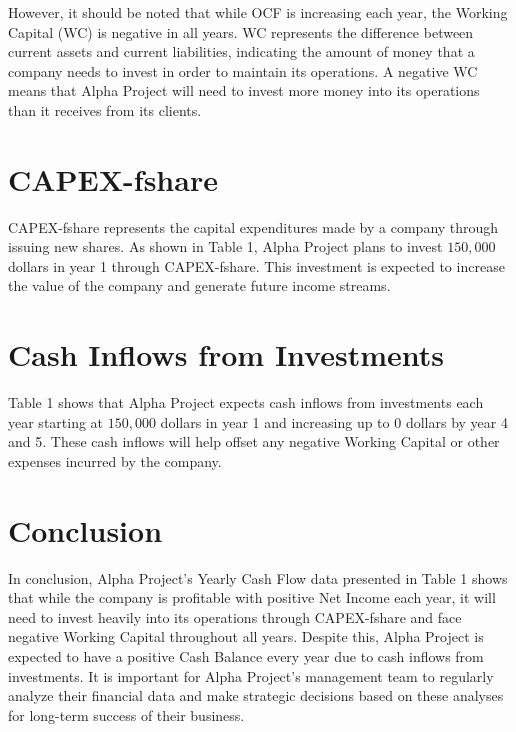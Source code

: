 However, it should be noted that while OCF is increasing each year, the Working Capital (WC) is negative in all years. WC represents the difference between current assets and current liabilities, indicating the amount of money that a company needs to invest in order to maintain its operations. A negative WC means that Alpha Project will need to invest more money into its operations than it receives from its clients.

\section{CAPEX-fshare}

CAPEX-fshare represents the capital expenditures made by a company through issuing new shares. As shown in Table 1, Alpha Project plans to invest $150,000$ dollars in year 1 through CAPEX-fshare. This investment is expected to increase the value of the company and generate future income streams.

\section{Cash Inflows from Investments}

Table 1 shows that Alpha Project expects cash inflows from investments each year starting at $150,000$ dollars in year 1 and increasing up to $0$ dollars by year 4 and 5. These cash inflows will help offset any negative Working Capital or other expenses incurred by the company.

\section{Conclusion}

In conclusion, Alpha Project's Yearly Cash Flow data presented in Table 1 shows that while the company is profitable with positive Net Income each year, it will need to invest heavily into its operations through CAPEX-fshare and face negative Working Capital throughout all years. Despite this, Alpha Project is expected to have a positive Cash Balance every year due to cash inflows from investments. It is important for Alpha Project's management team to regularly analyze their financial data and make strategic decisions based on these analyses for long-term success of their business.